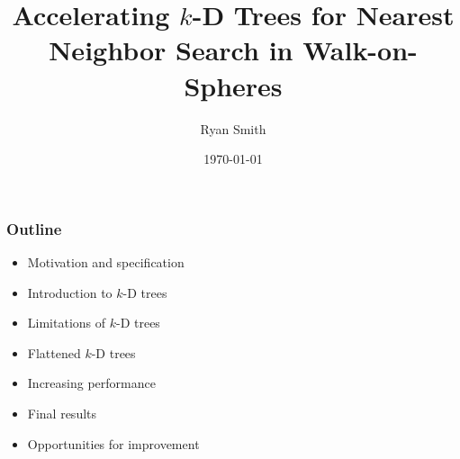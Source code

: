 \documentclass[lualatex,aspectratio=169]{beamer}
\title{Accelerating $k$-D Trees for Nearest Neighbor Search in Walk-on-Spheres}
\date[\today]{\today}
\author[Ryan Smith]{Ryan Smith}
\newcommand{\kd}{$k$-D\xspace}
\begin{document}
\begin{frame}
  \titlepage
\end{frame}

\begin{frame} 

  \frametitle{Outline} 

  \begin{itemize} 
    \item Motivation and specification
    \item Introduction to \kd trees
    \item Limitations of \kd trees
    \item Flattened \kd trees
    \item Increasing performance
    \item Final results
    \item Opportunities for improvement
  \end{itemize}

\end{frame}










\end{document}
